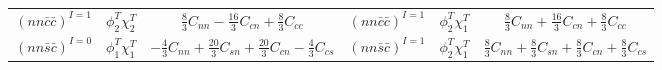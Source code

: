 \documentclass[prd,twocolumn,floatfix,nofootinbib]{revtex4}
\begin{document}
\begin{table}[!htb]
\begin{tabular}{cccccc}
${\left(nn\bar{c}\bar{c}\right)}^{I=1}$ & $\phi_{2}^{T}\chi_{2}^{T}$ & $%
\frac{8}{3}C_{nn}-\frac{16}{3}C_{cn}+\frac{8}{3}C_{cc}$ & ${\left(nn\bar{c}%
\bar{c}\right)}^{I=1}$ & $\phi_{2}^{T}\chi_{1}^{T}$ & $\frac{8}{3}C_{nn}+%
\frac{16}{3}C_{cn}+\frac{8}{3}C_{cc}$ \\
${\left(nn\bar{s}\bar{c}\right)}^{I=0}$ & $\phi_{1}^{T}\chi_{1}^{T}$ & $-%
\frac{4}{3}C_{nn}+\frac{20}{3}C_{sn}+\frac{20}{3}C_{cn}-\frac{4}{3}C_{cs}$ &
${\left(nn\bar{s}\bar{c}\right)}^{I=1}$ & $\phi_{2}^{T}\chi_{1}^{T}$ & $%
\frac{8}{3}C_{nn}+\frac{8}{3}C_{sn}+\frac{8}{3}C_{cn}+\frac{8}{3}C_{cs}$ \\
\hline\hline
\end{tabular}%
\end{table}

\renewcommand{\tabcolsep}{0.27cm} \renewcommand{\arraystretch}{1.5}
\end{document}
